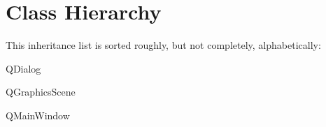 \section{Class Hierarchy}
This inheritance list is sorted roughly, but not completely, alphabetically\+:\begin{DoxyCompactList}
\item {}
\item Q\+Dialog\begin{DoxyCompactList}
\item {}
\end{DoxyCompactList}
\item Q\+Graphics\+Scene\begin{DoxyCompactList}
\item {}
\end{DoxyCompactList}
\item Q\+Main\+Window\begin{DoxyCompactList}
\item {}
\end{DoxyCompactList}
\item {}
\end{DoxyCompactList}
